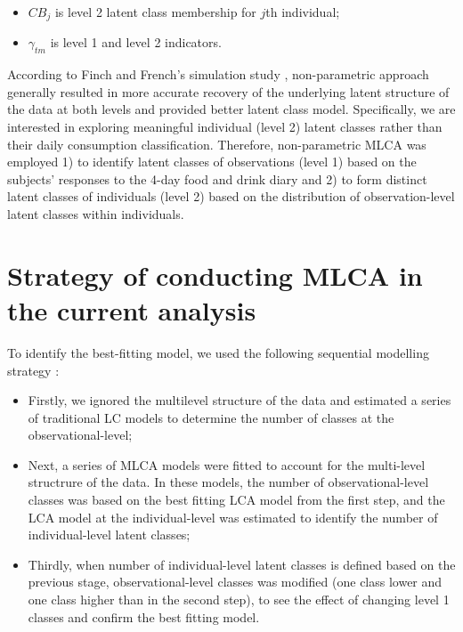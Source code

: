 \begin{itemize}
	\item $CB_j$ is level 2 latent class membership for $j$th individual;
	\item $\gamma_{tm}$ is level 1 and level 2 indicators. 
\end{itemize}

According to Finch and French's simulation study \parencite{finch2014multilevel}, non-parametric approach generally resulted in more accurate recovery of the underlying latent structure of the data at both levels and provided better latent class model. Specifically, we are interested in exploring meaningful individual (level 2) latent classes rather than their daily consumption classification. Therefore, non-parametric MLCA was employed 1) to identify latent classes of observations (level 1) based on the subjects' responses to the 4-day food and drink diary and 2) to form distinct latent classes of individuals (level 2) based on the distribution of observation-level latent classes within individuals.\vspace{-0.3cm}
 

\section{Strategy of conducting MLCA in the current analysis}\vspace{-0.3cm}

To identify the best-fitting model, we used the following sequential modelling strategy \parencite{henry2010multilevel}: 

\begin{itemize}
	\item Firstly, we ignored the multilevel structure of the data and estimated a series of traditional LC models to determine the number of classes at the observational-level;
	\item Next, a series of MLCA models were fitted to account for the multi-level structrure of the data. In these models, the number of observational-level classes was based on the best fitting LCA model from the first step, and the LCA model at the individual-level was estimated to identify the number of individual-level latent classes;
	\item Thirdly, when number of individual-level latent classes is defined based on the previous stage, observational-level classes was modified (one class lower and one class higher than in the second step), to see the effect of changing level 1 classes and confirm the best fitting model.
\end{itemize}

